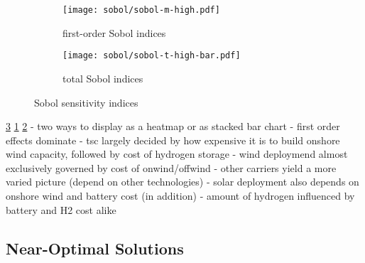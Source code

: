 
\begin{figure}
    \begin{subfigure}[t]{0.45\textwidth}
        \caption{first-order Sobol indices}
        \label{fig:sobol:first}
        \texttt{[image: sobol/sobol-m-high.pdf]}
    \end{subfigure}
    \begin{subfigure}[t]{0.54\textwidth}
        \caption{total Sobol indices}
        \label{fig:sobol:total}
        \texttt{[image: sobol/sobol-t-high-bar.pdf]}
    \end{subfigure}
    \caption{Sobol sensitivity indices}
    \label{fig:sobol}
\end{figure}

\cref{fig:sobol} \cref{fig:sobol:first} \cref{fig:sobol:total}
- two ways to display as a heatmap or as stacked bar chart
- first order effects dominate
- tsc largely decided by how expensive it is to build onshore wind capacity, followed by cost of hydrogen storage
- wind deploymend almost exclusively governed by cost of onwind/offwind
- other carriers yield a more varied picture (depend on other technologies)
- solar deployment also depends on onshore wind and battery cost (in addition)
- amount of hydrogen influenced by battery and H2 cost alike

\subsection{Near-Optimal Solutions}



